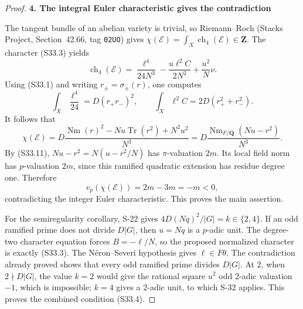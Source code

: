 \begin{proof}
\par\medskip\noindent\textbf{4. The integral Euler characteristic gives the contradiction}\quad 

The tangent bundle of an abelian variety is trivial, so Riemann--Roch (Stacks Project, Section~42.66, tag \texttt{02UO}) gives \(\chi(\mathcal E)=\int_X\operatorname{ch}_4(\mathcal E)\in\mathbf Z\). The character (S33.3) yields \[
 \operatorname{ch}_4(\mathcal E)
 =\frac{\ell^4}{24N^3}
       -\frac{u\ell^2C}{2N^2}+\frac{u^2}{N}\nu.
\] Using (S33.1) and writing \(r_\pm=\sigma_\pm(r)\), one computes \[
 \int_X\frac{\ell^4}{24}=D(r_+r_-)^2,
 \qquad
 \int_X\ell^2C=2D(r_+^2+r_-^2).
\] It follows that \[
 \chi(\mathcal E)
 =D\frac{\operatorname{Nm}(r)^2-Nu\operatorname{Tr}(r^2)+N^2u^2}{N^3}
 =D\frac{\operatorname{Nm}_{F/\mathbf Q}(Nu-r^2)}{N^3}.
 \tag{S33.12}
\] By (S33.11), \(Nu-r^2=N(u-r^2/N)\) has \(\pi\)-valuation \(2m\). Its local field norm has \(p\)-valuation \(2m\), since this ramified quadratic extension has residue degree one. Therefore \[
 v_p(\chi(\mathcal E))=2m-3m=-m<0,
 \tag{S33.13}
\] contradicting the integer Euler characteristic. This proves the main assertion.

For the semiregularity corollary, S-22 gives \(4D(Nq)^2/|G|=k\in\{2,4\}\). If an odd ramified prime does not divide \(D|G|\), then \(u=Nq\) is a \(p\)-adic unit. The degree-two character equation forces \(B=-\ell/N\), so the proposed normalized character is exactly (S33.3). The Néron--Severi hypothesis gives \(\ell\in F\theta\). The contradiction already proved shows that every odd ramified prime divides \(D|G|\). At \(2\), when \(2\nmid D|G|\), the value \(k=2\) would give the rational square \(u^2\) odd \(2\)-adic valuation \(-1\), which is impossible; \(k=4\) gives a \(2\)-adic unit, to which S-32 applies. This proves the combined condition (S33.4).
\end{proof}
